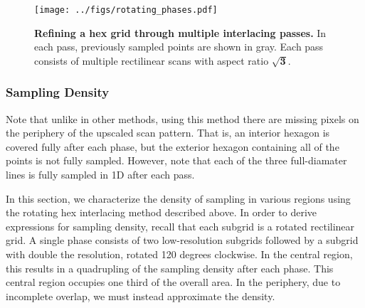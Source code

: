 \documentclass[aip, amsmath, amssymb, nobibnotes, nofootinbib, citeautoscript, reprint, superscriptaddress]{revtex4-1}
\begin{document}
    \begin{figure*}
        \centering
        \texttt{[image: ../figs/rotating\_phases.pdf]}
        \caption{
            \label{fig:rotatingphases} 
            \textbf{Refining a hex grid through multiple interlacing passes.}
            In each pass, previously sampled points are shown in gray.
            Each pass consists of multiple rectilinear scans with aspect ratio $\mathbf{\sqrt{3}}$.
            }
    \end{figure*}




    \subsubsection{\label{sec:density}Sampling Density}

    Note that unlike in other methods, using this method there are missing pixels on the periphery of the upscaled scan pattern.
    That is, an interior hexagon is covered fully after each phase, but the exterior hexagon containing all of the points is not fully sampled.
    However, note that each of the three full-diamater lines is fully sampled in 1D after each pass.


    In this section, we characterize the density of sampling in various regions using the rotating hex interlacing method described above.
    In order to derive expressions for sampling density, recall that each subgrid is a rotated rectilinear grid.
    A single phase consists of two low-resolution subgrids followed by a subgrid with double the resolution, rotated 120 degrees clockwise.
    In the central region, this results in a quadrupling of the sampling density after each phase.
    This central region occupies one third of the overall area.
    In the periphery, due to incomplete overlap, we must instead approximate the density.
\end{document}
